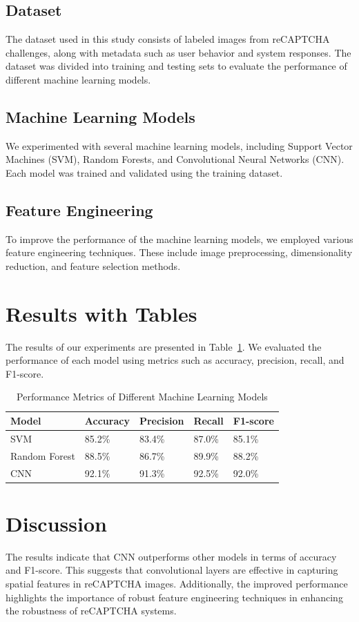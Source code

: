 \documentclass{article}
\begin{document}
\subsection{Dataset}
The dataset used in this study consists of labeled images from reCAPTCHA challenges, along with metadata such as user behavior and system responses. The dataset was divided into training and testing sets to evaluate the performance of different machine learning models.

\subsection{Machine Learning Models}
We experimented with several machine learning models, including Support Vector Machines (SVM), Random Forests, and Convolutional Neural Networks (CNN). Each model was trained and validated using the training dataset.

\subsection{Feature Engineering}
To improve the performance of the machine learning models, we employed various feature engineering techniques. These include image preprocessing, dimensionality reduction, and feature selection methods.

\section{Results with Tables}
\label{sec:results}
The results of our experiments are presented in Table~\ref{tab:results}. We evaluated the performance of each model using metrics such as accuracy, precision, recall, and F1-score.

\begin{table}[htbp]
\centering
\caption{Performance Metrics of Different Machine Learning Models}
\label{tab:results}
\begin{tabular}{@{}lllll@{}}
\toprule
Model & Accuracy & Precision & Recall & F1-score \\ \midrule
SVM   & 85.2\%   & 83.4\%    & 87.0\%  & 85.1\%   \\
Random Forest & 88.5\% & 86.7\% & 89.9\% & 88.2\% \\
CNN   & 92.1\%   & 91.3\%    & 92.5\%  & 92.0\%   \\ \bottomrule
\end{tabular}
\end{table}

\section{Discussion}
The results indicate that CNN outperforms other models in terms of accuracy and F1-score. This suggests that convolutional layers are effective in capturing spatial features in reCAPTCHA images. Additionally, the improved performance highlights the importance of robust feature engineering techniques in enhancing the robustness of reCAPTCHA systems.
\end{document}
